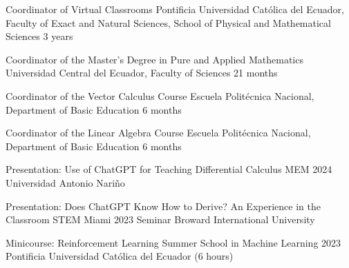 \documentclass[
    a4paper,
    maincolor=cvblue!70!blue,
    sidecolor=gray!30,
    sectioncolor=cvblue!70!blue,
    sidebarwidth=7.5cm,
    topbottommargin=20pt,
    leftrightmargin=20pt,
]{fortysecondscv}
\begin{document}
    {Coordinator of Virtual Classrooms}
    {Pontificia Universidad Católica del Ecuador, Faculty of Exact and Natural Sciences, School of Physical and Mathematical Sciences}
    {3 years}
    
    {Coordinator of the Master's Degree in Pure and Applied Mathematics}
    {Universidad Central del Ecuador, Faculty of Sciences}
    {21 months}
    
    {Coordinator of the Vector Calculus Course}
    {Escuela Politécnica Nacional, Department of Basic Education}
    {6 months}
    
    {Coordinator of the Linear Algebra Course}
    {Escuela Politécnica Nacional, Department of Basic Education}
    {6 months}
    



\newpage
{}



    {Presentation: Use of ChatGPT for Teaching Differential Calculus}
    {MEM 2024}
    {Universidad Antonio Nariño}
    
    
    {Presentation: Does ChatGPT Know How to Derive? An Experience in the Classroom}
    {STEM Miami 2023 Seminar}
    {Broward International University}
    
    
    {Minicourse: Reinforcement Learning}
    {Summer School in Machine Learning 2023}
    {Pontificia Universidad Católica del Ecuador (6 hours)}
    
\end{document}
